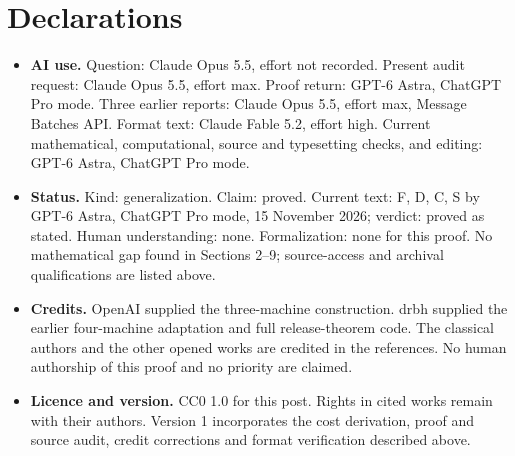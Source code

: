 \documentclass[11pt,a4paper]{article}
\theoremstyle{plain}
\theoremstyle{definition}
\newcommand{\fixedhead}[1]{\section*{#1}}
\begin{document}
\fixedhead{Declarations}
\begin{itemize}[leftmargin=*,itemsep=3pt]
\item \textbf{AI use.} Question: Claude Opus 5.5, effort not recorded. Present audit request: Claude Opus 5.5, effort max. Proof return: GPT-6 Astra, ChatGPT Pro mode. Three earlier reports: Claude Opus 5.5, effort max, Message Batches API. Format text: Claude Fable 5.2, effort high. Current mathematical, computational, source and typesetting checks, and editing: GPT-6 Astra, ChatGPT Pro mode.
\item \textbf{Status.} Kind: generalization. Claim: proved. Current text: F, D, C, S by GPT-6 Astra, ChatGPT Pro mode, 15 November 2026; verdict: proved as stated. Human understanding: none. Formalization: none for this proof. No mathematical gap found in Sections 2--9; source-access and archival qualifications are listed above.
\item \textbf{Credits.} OpenAI \cite[Sections 2--9]{P} supplied the three-machine construction. drbh \cite[commit \texttt{bbd3013}]{D} supplied the earlier four-machine adaptation and full release-theorem code. The classical authors and the other opened works are credited in the references. No human authorship of this proof and no priority are claimed.
\item \textbf{Licence and version.} CC0 1.0 for this post. Rights in cited works remain with their authors. Version 1 incorporates the cost derivation, proof and source audit, credit corrections and format verification described above.
\end{itemize}
\end{document}
